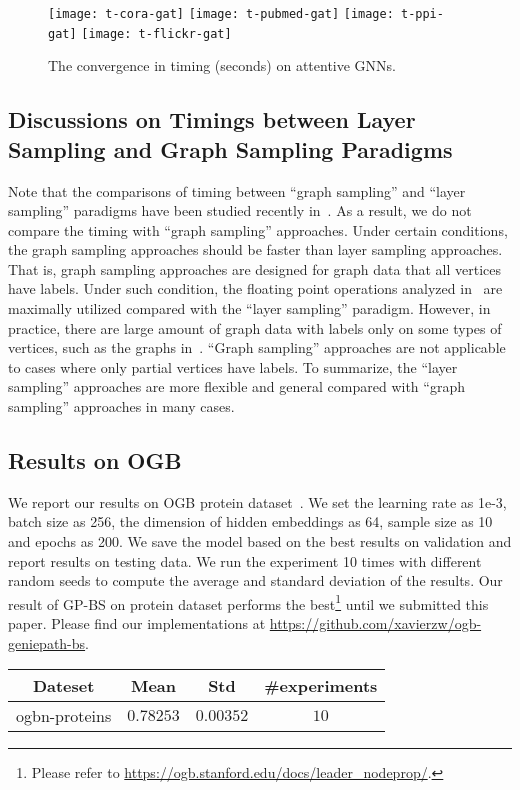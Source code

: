 \documentclass{article}
\begin{document}
\begin{figure*}[h]
\texttt{[image: t-cora-gat]}
\texttt{[image: t-pubmed-gat]}
\texttt{[image: t-ppi-gat]}
\texttt{[image: t-flickr-gat]}
\caption{The convergence in timing (seconds) on attentive GNNs.}
\label{fig:timing_gat}
\end{figure*}
\subsection{Discussions on Timings between Layer Sampling and Graph Sampling Paradigms}\label{appendix:layer_vs_graph}

Note that the comparisons of 
timing between ``graph sampling'' and ``layer sampling'' 
paradigms have been studied recently in~\cite{chiang2019cluster,zeng2019graphsaint}.
As a result, we do not compare the timing with ``graph sampling'' approaches.
Under certain conditions, the graph sampling approaches 
should be faster than layer sampling approaches. That is, graph sampling approaches
are designed for graph data that all vertices have labels.
Under such condition, the floating point operations analyzed in~\cite{chiang2019cluster}
are maximally utilized compared with the ``layer sampling'' paradigm.
However, in practice, there are large amount of graph data with labels
only on some types of vertices, such as the graphs in~\cite{liu2018heterogeneous}.
``Graph sampling'' approaches
are not applicable to cases where only partial vertices have labels.
To summarize, the
``layer sampling'' approaches are more flexible
and general compared with ``graph sampling''
approaches in many cases.

\subsection{Results on OGB}
We report our results on 
OGB protein dataset~\cite{hu2020open}. We set the learning rate as 1e-3, batch size as 256, the dimension of hidden embeddings as 64, sample size as 10 and epochs as 200. We save the model based on the best results on validation and report results on testing data. We run the experiment 10 times with different random seeds to compute the average and standard deviation of the results. Our result of GP-BS on protein dataset performs the best\footnote{Please refer to \url{https://ogb.stanford.edu/docs/leader_nodeprop/}.}
until we submitted this paper. Please find our implementations at \url{https://github.com/xavierzw/ogb-geniepath-bs}.

\setlength{\tabcolsep}{1pt}
\begin{table}[H]
  \centering
  \begin{tabular}{cccc}
  	\toprule
    Dateset & Mean & Std & \#experiments \\
    \midrule
    ogbn-proteins&  $0.78253$ & $0.00352$ & $10$ \\
  \bottomrule
\end{tabular}
\end{table}
\end{document}

